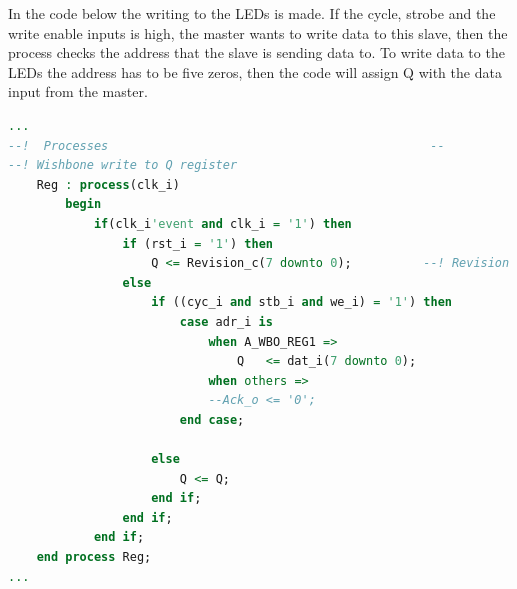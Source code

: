 In the code below the writing to the LEDs is made. If the cycle, strobe and the write enable inputs is high, the master wants to write data to this slave, then the process checks the address that the slave is sending data to. To write data to the LEDs the address has to be five zeros, then the code will assign Q with the data input from the master.
\begin{lstlisting}[language=VHDL]
...
--!  Processes                                             --
--! Wishbone write to Q register
	Reg : process(clk_i)
		begin
			if(clk_i'event and clk_i = '1') then
				if (rst_i = '1') then
					Q <= Revision_c(7 downto 0);          --! Revision readable at reset 
				else
					if ((cyc_i and stb_i and we_i) = '1') then
						case adr_i is
							when A_WBO_REG1 =>
								Q	<= dat_i(7 downto 0);
							when others =>
							--Ack_o <= '0'; 
						end case;
						
					else
						Q <= Q;
					end if;
				end if;
			end if;
	end process Reg;
...
\end{lstlisting}
